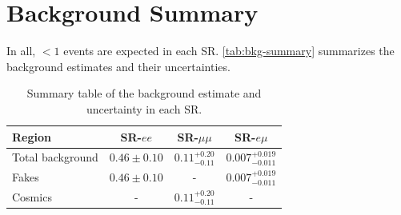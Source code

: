 \section{Background Summary}

In all, $<1$ events are expected in each \ac{SR}. \autoref{tab:bkg-summary} summarizes the background estimates and their uncertainties.

\begin{table}
\centering
\begin{tabular}{lccc}
Region 			 & SR-$ee$ 			& SR-$\mu\mu$ 				& SR-$e\mu$ \\
\hline
Total background & $0.46 \pm 0.10$ 	& $0.11 ^{+0.20}_{-0.11}$	& $0.007^{+0.019}_{-0.011}$\\
\hline
Fakes 			 & $0.46 \pm 0.10$ 	& - 						& $0.007^{+0.019}_{-0.011}$\\
Cosmics 		 & - 				& $0.11 ^{+0.20}_{-0.11}$ 	& - \\
\hline
\end{tabular}
\caption{Summary table of the background estimate and uncertainty in each \ac{SR}.}
\label{tab:bkg-summary}
\end{table}





